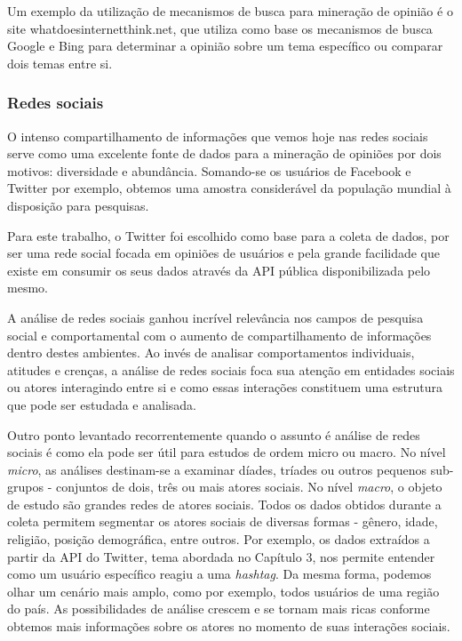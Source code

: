 Um exemplo da utilização de mecanismos de busca para mineração de opinião é o site whatdoesinternetthink.net\cite{whatdoesinternetthink}, que utiliza como base os mecanismos de busca Google e Bing para determinar a opinião sobre um tema específico ou comparar dois temas entre si.

\subsubsection{Redes sociais}

O intenso compartilhamento de informações que vemos hoje nas redes sociais serve como uma excelente fonte de dados para a mineração de opiniões por dois motivos: diversidade e abundância. Somando-se os usuários de Facebook e Twitter por exemplo, obtemos uma amostra considerável da população mundial à disposição para pesquisas.

Para este trabalho, o Twitter foi escolhido como base para a coleta de dados, por ser uma rede social focada em opiniões de usuários e pela grande facilidade que existe em consumir os seus dados através da API pública disponibilizada pelo mesmo.

A análise de redes sociais ganhou incrível relevância nos campos de pesquisa social e comportamental\cite{wasserman1994advances} com o aumento de compartilhamento de informações dentro destes ambientes. Ao invés de analisar comportamentos individuais, atitudes e crenças, a análise de redes sociais foca sua atenção em entidades sociais ou atores interagindo entre si e como essas interações constituem uma estrutura que pode ser estudada e analisada.

Outro ponto levantado recorrentemente quando o assunto é análise de redes sociais é como ela pode ser útil para estudos de ordem micro ou macro. No nível \textit{micro}, as análises destinam-se a examinar díades, tríades ou outros pequenos sub-grupos - conjuntos de dois, três ou mais atores sociais. No nível \textit{macro}, o objeto de estudo são grandes redes de atores sociais.
Todos os dados obtidos durante a coleta permitem segmentar os atores sociais de diversas formas - gênero, idade, religião, posição demográfica, entre outros. Por exemplo, os dados extraídos a partir da API do Twitter, tema abordada no Capítulo 3, nos permite entender como um usuário específico reagiu a uma \textit{hashtag}. Da mesma forma, podemos olhar um cenário mais amplo, como por exemplo, todos usuários de uma região do país. As possibilidades de análise crescem e se tornam mais ricas conforme obtemos mais informações sobre os atores no momento de suas interações sociais.

